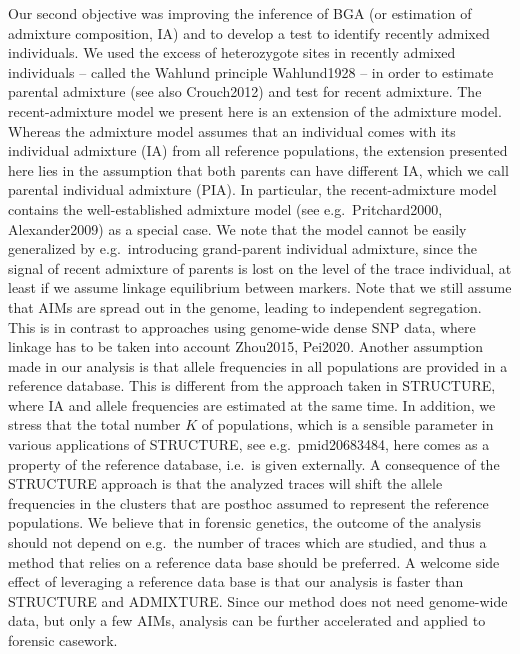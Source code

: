 \documentclass[12pt]{article}
\theoremstyle{definition}
\begin{document}
Our second objective was improving the inference of BGA (or estimation of admixture composition, IA) and to develop a test to identify recently admixed individuals. We used the excess of heterozygote sites in recently admixed individuals -- called the Wahlund principle \cite{article}{Wahlund1928} -- in order to estimate parental admixture (see also \cite{article}{Crouch2012}) and test for recent admixture. {\color{blue}The recent-admixture model we present here is an extension of the admixture model. Whereas the admixture model assumes that an individual comes with its individual admixture (IA) from all reference populations, the extension presented here lies in the assumption that both parents can have different IA, which we call parental individual admixture (PIA). In particular, the recent-admixture model contains the well-established admixture model (see e.g.\ \cite{article}{Pritchard2000, Alexander2009}) as a special case. We note that the model cannot be easily generalized by e.g.\ introducing grand-parent individual admixture, since the signal of recent admixture of parents is lost on the level of the trace individual, at least if we assume linkage equilibrium between markers.}
Note that we still assume that AIMs are spread out in the genome, leading to independent segregation. This is in contrast to approaches using genome-wide dense SNP data, where linkage has to be taken into account \cite{article}{Zhou2015, Pei2020}. Another assumption made in our analysis is that allele frequencies in all populations are provided in a reference database. {\color{blue}This is different from the approach taken in {\sc STRUCTURE}, where IA} and allele frequencies are estimated at the same time. {\color{blue}In addition, we stress that the total number $K$ of populations, which is a sensible parameter in various applications of {\sc STRUCTURE}, see e.g.\ \cite{article}{pmid20683484}, here comes as a property of the reference database, i.e.\ is given externally.} A consequence of the {\sc STRUCTURE} approach is that the analyzed traces will shift the allele frequencies in the clusters that are posthoc assumed to represent the reference populations. We believe that in forensic genetics, the outcome of the analysis should not depend on e.g.\ the number of traces which are studied, and thus a method that relies on a reference data base should be preferred. A welcome side effect of leveraging a reference data base is that our analysis is faster than {\sc STRUCTURE} and {\sc ADMIXTURE}. Since our method does not need genome-wide data, but only a few AIMs, analysis can be further accelerated and applied to forensic casework. 
\end{document}

